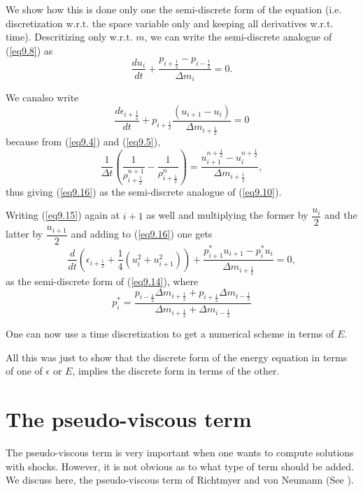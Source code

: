 We show how this is done only one the semi-discrete form of the equation (i.e. discretization w.r.t. the space variable only and keeping all derivatives w.r.t. time). Descritizing only w.r.t. $m$, we can write the semi-discrete analogue of (\ref{eq9.8}) as 
\begin{equation*}
\frac{du_i}{dt} + \frac{p_{i+\frac{1}{2}} - p_{i-\frac{1}{2}}}{\Delta m_i}  =0 . 
\tag{9.15}\label{eq9.15}
\end{equation*}

We can\pageoriginale also write 
\begin{equation*}
\frac{d\epsilon_{i+\frac{1}{2}}}{dt} + p_{i+\frac{1}{2}} \frac{(u_{i+1} - u_i)}{\Delta m_{i+\frac{1}{2}}} = 0\tag{9.16}\label{eq9.16}
\end{equation*}
because from (\ref{eq9.4}) and (\ref{eq9.5}),
$$
\frac{1}{\Delta t} \left(\frac{1}{\rho^{n+1}_{i+\frac{1}{2}}} -
\frac{1}{\rho^n_{i+\frac{1}{2}}}\right) = \frac{u^{n+\frac{1}{2}}_{i+1} -
  u^{n+\frac{1}{2}}_i}{\Delta m_{i+\frac{1}{2}}}, 
$$
thus giving (\ref{eq9.16}) as the semi-discrete analogue of (\ref{eq9.10}).

Writing (\ref{eq9.15}) again at $i+1$ as well and multiplying the former by $\dfrac{u_i}{2}$ and the latter by $\dfrac{u_{i+1}}{2}$ and adding to (\ref{eq9.16}) one gets
\begin{equation*}
\frac{d}{dt} (\epsilon_{i+\frac{1}{2}} +  \frac{1}{4} (u^2_i + u^2_{i+1}))  + \frac{p^*_{i+1} u_{i+1} - p^*_i u_i}{\Delta m_{i+\frac{1}{2}}} = 0, \tag{9.17}\label{eq9.17}
\end{equation*}
as the semi-discrete form of (\ref{eq9.14}), where
\begin{equation*}
p^*_i = \frac{p_{i-\frac{1}{2}} \Delta m_{i+\frac{1}{2}} + p_{i + \frac{1}{2}} \Delta m_{i-\frac{1}{2}}}{\Delta m_{i+\frac{1}{2}} + \Delta m_{i-\frac{1}{2}}} 
\tag{9.18}\label{eq9.18}
\end{equation*}

One can now use a time discretization to get a numerical scheme in terms of $E$.

All this was just to show  that the discrete form of the energy equation in terms of one of $\epsilon$ or $E$, implies the discrete form in terms of the other. 

\section{The pseudo-viscous term}\label{chap9:sec9.5}

The pseudo-viscous term is very important when one wants to compute
solutions with shocks. However, it is not obvious as to what type of
term should be added. We discuss here, the pseudo-viscous term of
Richtmyer and von Neumann (See \cite{key31}).  

